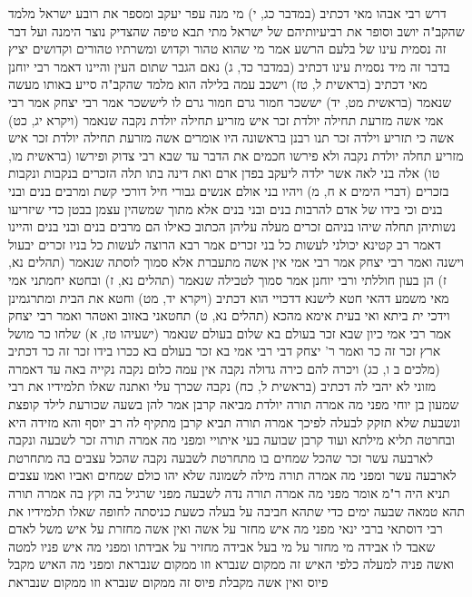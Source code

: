 \documentclass[12pt, openany]{book}
\begin{document}
{דרש רבי אבהו  מאי דכתיב (במדבר כג, י) מי מנה עפר יעקב ומספר את רובע ישראל  מלמד שהקב"ה יושב וסופר את רביעיותיהם של ישראל מתי תבא טיפה שהצדיק נוצר הימנה 
ועל דבר זה נסמית עינו של בלעם הרשע  אמר  מי שהוא טהור וקדוש ומשרתיו טהורים וקדושים יציץ בדבר זה  מיד נסמית עינו דכתיב  (במדבר כד, ג) נאם הגבר שתום העין 
והיינו דאמר רבי יוחנן מאי דכתיב (בראשית ל, טז) וישכב עמה בלילה הוא  מלמד שהקב"ה סייע באותו מעשה שנאמר  (בראשית מט, יד) יששכר חמור גרם חמור גרם לו ליששכר 
אמר רבי יצחק אמר רבי אמי  אשה מזרעת תחילה יולדת זכר איש מזריע תחילה יולדת נקבה שנאמר  (ויקרא יג, כט) אשה כי תזריע וילדה זכר 
תנו רבנן  בראשונה היו אומרים אשה מזרעת תחילה יולדת זכר איש מזריע תחלה יולדת נקבה ולא פירשו חכמים את הדבר  עד שבא רבי צדוק ופירשו  (בראשית מו, טו) אלה בני לאה אשר ילדה ליעקב בפדן ארם ואת דינה בתו תלה הזכרים בנקבות ונקבות בזכרים 
(דברי הימים א ח, מ) ויהיו בני אולם אנשים גבורי חיל דורכי קשת ומרבים בנים ובני בנים וכי בידו של אדם להרבות בנים ובני בנים  אלא מתוך
שמשהין עצמן בבטן כדי שיזריעו נשותיהן תחלה שיהו בניהם זכרים מעלה עליהן הכתוב כאילו הם מרבים בנים ובני בנים  והיינו דאמר רב קטינא  יכולני לעשות כל בני זכרים  אמר רבא  הרוצה לעשות כל בניו זכרים יבעול וישנה 
ואמר רבי יצחק אמר רבי אמי  אין אשה מתעברת אלא סמוך לוסתה שנאמר  (תהלים נא, ז) הן בעון חוללתי 
ורבי יוחנן אמר  סמוך לטבילה שנאמר  (תהלים נא, ז) ובחטא יחמתני אמי 
מאי משמע דהאי חטא לישנא דדכויי הוא  דכתיב  (ויקרא יד, מט) וחטא את הבית ומתרגמינן  וידכי ית ביתא  ואי בעית אימא מהכא (תהלים נא, ט) תחטאני באזוב ואטהר 
ואמר רבי יצחק אמר רבי אמי  כיון שבא זכר בעולם בא שלום בעולם שנאמר (ישעיהו טז, א) שלחו כר מושל ארץ זכר זה כר 
ואמר ר' יצחק דבי רבי אמי  בא זכר בעולם בא ככרו בידו  זכר זה כר דכתיב  (מלכים ב ו, כג) ויכרה להם כירה גדולה 
נקבה אין עמה כלום נקבה נקייה באה  עד דאמרה מזוני לא יהבי לה דכתיב  (בראשית ל, כח) נקבה שכרך עלי ואתנה 
שאלו תלמידיו את רבי שמעון בן יוחי  מפני מה אמרה תורה יולדת מביאה קרבן  אמר להן  בשעה שכורעת לילד קופצת ונשבעת שלא תזקק לבעלה  לפיכך אמרה תורה תביא קרבן 
מתקיף לה רב יוסף  והא מזידה היא ובחרטה תליא מילתא  ועוד קרבן שבועה בעי איתויי 
ומפני מה אמרה תורה זכר לשבעה ונקבה לארבעה עשר  זכר שהכל שמחים בו מתחרטת לשבעה  נקבה שהכל עצבים בה מתחרטת לארבעה עשר 
ומפני מה אמרה תורה מילה לשמונה  שלא יהו כולם שמחים ואביו ואמו עצבים 
תניא היה ר"מ אומר  מפני מה אמרה תורה נדה לשבעה  מפני שרגיל בה וקץ בה  אמרה תורה  תהא טמאה שבעה ימים כדי שתהא חביבה על בעלה כשעת כניסתה לחופה 
שאלו תלמידיו את רבי דוסתאי ברבי ינאי  מפני מה איש מחזר על אשה ואין אשה מחזרת על איש  משל לאדם שאבד לו אבידה מי מחזר על מי  בעל אבידה מחזיר על אבידתו 
ומפני מה איש פניו למטה ואשה פניה למעלה כלפי האיש  זה ממקום שנברא וזו ממקום שנבראת 
ומפני מה האיש מקבל פיוס ואין אשה מקבלת פיוס  זה ממקום שנברא וזו ממקום שנבראת 
}
\end{document}
